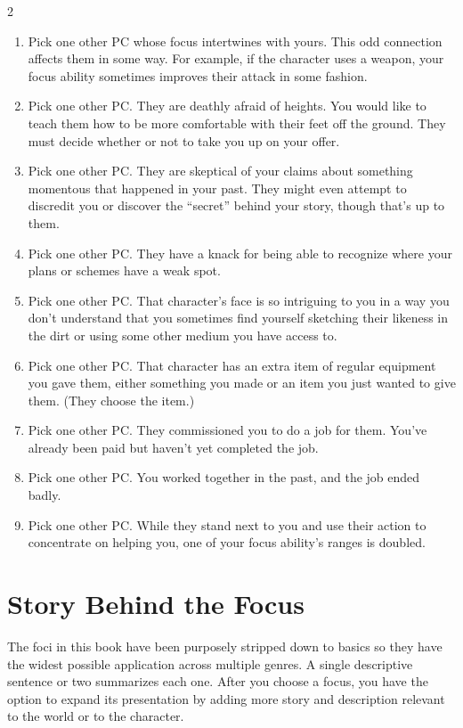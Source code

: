 \begin{multicols}{2}
\begin{enumerate}
\item Pick one other PC whose focus intertwines with yours. This odd connection affects them in some way. For example, if the character uses a weapon, your focus ability sometimes improves their attack in some fashion.
\item Pick one other PC. They are deathly afraid of heights. You would like to teach them how to be more comfortable with their feet off the ground. They must decide whether or not to take you up on your offer.
\item Pick one other PC. They are skeptical of your claims about something momentous that happened in your past. They might even attempt to discredit you or discover the “secret” behind your story, though that’s up to them.
\item Pick one other PC. They have a knack for being able to recognize where your plans or schemes have a weak spot.
\item Pick one other PC. That character’s face is so intriguing to you in a way you don’t understand that you sometimes find yourself sketching their likeness in the dirt or using some other medium you have access to.
\item Pick one other PC. That character has an extra item of regular equipment you gave them, either something you made or an item you just wanted to give them. (They choose the item.)
\item Pick one other PC. They commissioned you to do a job for them. You’ve already been paid but haven’t yet completed the job.
\item Pick one other PC. You worked together in the past, and the job ended badly.
\item Pick one other PC. While they stand next to you and use their action to concentrate on helping you, one of your focus ability’s ranges is doubled. 
\end{enumerate}

\section{Story Behind the Focus}

The foci in this book have been purposely stripped down to basics so they have the widest possible application across multiple genres. A single descriptive sentence or two summarizes each one. After you choose a focus, you have the option to expand its presentation by adding more story and description relevant to the world or to the character.


\end{multicols}
